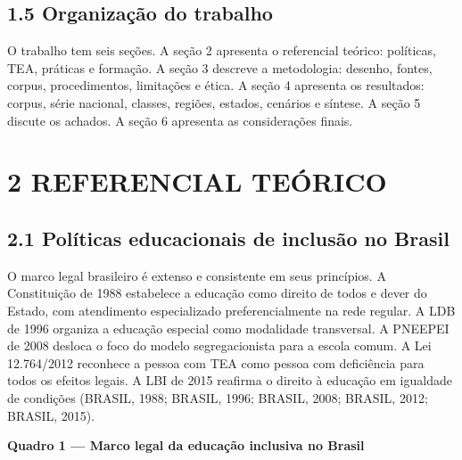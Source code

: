 \subsection{1.5 Organização do
trabalho}\label{organizauxe7uxe3o-do-trabalho}

O trabalho tem seis seções. A seção 2 apresenta o referencial teórico:
políticas, TEA, práticas e formação. A seção 3 descreve a metodologia:
desenho, fontes, corpus, procedimentos, limitações e ética. A seção 4
apresenta os resultados: corpus, série nacional, classes, regiões,
estados, cenários e síntese. A seção 5 discute os achados. A seção 6
apresenta as considerações finais.

\section{2 REFERENCIAL TEÓRICO}\label{referencial-teuxf3rico}

\subsection{2.1 Políticas educacionais de inclusão no
Brasil}\label{poluxedticas-educacionais-de-inclusuxe3o-no-brasil}

O marco legal brasileiro é extenso e consistente em seus princípios. A
Constituição de 1988 estabelece a educação como direito de todos e dever
do Estado, com atendimento especializado preferencialmente na rede
regular. A LDB de 1996 organiza a educação especial como modalidade
transversal. A PNEEPEI de 2008 desloca o foco do modelo segregacionista
para a escola comum. A Lei 12.764/2012 reconhece a pessoa com TEA como
pessoa com deficiência para todos os efeitos legais. A LBI de 2015
reafirma o direito à educação em igualdade de condições (BRASIL, 1988;
BRASIL, 1996; BRASIL, 2008; BRASIL, 2012; BRASIL, 2015).


\textbf{Quadro 1 --- Marco legal da educação inclusiva no Brasil}

\begingroup\small

